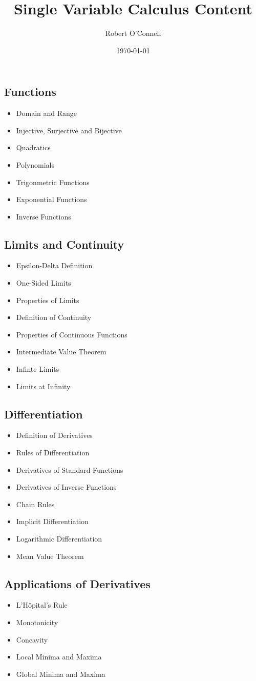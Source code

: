 \documentclass{article}
\title{\textbf{Single Variable Calculus Content}}
\author{Robert O'Connell}
\date{\today}
\begin{document}
\maketitle
\vspace{5mm}
\subsection*{Functions}
\begin{itemize}
    \item Domain and Range
    \item Injective, Surjective and Bijective
    \item Quadratics
    \item Polynomials
    \item Trigonmetric Functions
    \item Exponential Functions
    \item Inverse Functions
\end{itemize}

\subsection*{Limits and Continuity}
\begin{itemize}
    \item Epsilon-Delta Definition
    \item One-Sided Limits
    \item Properties of Limits
    \item Definition of Continuity
    \item Properties of Continuous Functions
    \item Intermediate Value Theorem
    \item Infinte Limits
    \item Limits at Infinity
\end{itemize}

\subsection*{Differentiation}
\begin{itemize}
    \item Definition of Derivatives
    \item Rules of Differentiation
    \item Derivatives of Standard Functions
    \item Derivatives of Inverse Functions
    \item Chain Rules
    \item Implicit Differentiation
    \item Logarithmic Differentiation
    \item Mean Value Theorem
\end{itemize}

\subsection*{Applications of Derivatives}
\begin{itemize}
    \item L'Hôpital's Rule
    \item Monotonicity
    \item Concavity
    \item Local Minima and Maxima
    \item Global Minima and Maxima
\end{itemize}
\end{document}
